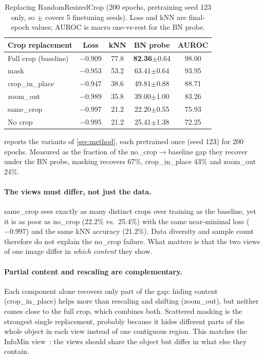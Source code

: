 \documentclass[10pt,twocolumn,letterpaper]{article}
\newcommand{\pmstd}[1]{{\scriptsize$\pm$#1}}
\begin{document}
\begin{table}[t]
\centering
\small
\setlength\tabcolsep{3pt}
\begin{tabular}{lcccc}
\toprule
Crop replacement & Loss & kNN & BN probe & AUROC \\
\midrule
Full crop (baseline) & $-0.909$ & 77.8 & \textbf{82.36}\pmstd{0.64} & 98.00 \\
mask & $-0.953$ & 53.2 & 63.41\pmstd{0.64} & 93.95 \\
crop\_in\_place & $-0.947$ & 38.6 & 49.81\pmstd{0.88} & 88.71 \\
zoom\_out & $-0.989$ & 35.8 & 39.00\pmstd{1.00} & 83.26 \\
same\_crop & $-0.997$ & 21.2 & 22.20\pmstd{0.55} & 75.93 \\
No crop & $-0.995$ & 21.2 & 25.41\pmstd{1.38} & 72.25 \\
\bottomrule
\end{tabular}
\caption{Replacing RandomResizedCrop (200 epochs, pretraining seed 123 only, so $\pm$ covers 5 finetuning seeds). Loss and kNN are final-epoch values; AUROC is macro one-vs-rest for the BN probe.}
\label{tab:crop}
\end{table}

 reports the variants of \cref{sec:method}, each pretrained once (seed 123) for 200 epochs.
Measured as the fraction of the no\_crop$\to$baseline gap they recover under the BN probe, masking recovers 67\%, crop\_in\_place 43\% and zoom\_out 24\%.

\paragraph{The views must differ, not just the data.}
same\_crop sees exactly as many distinct crops over training as the baseline, yet it is as poor as no\_crop (22.2\% vs.\ 25.4\%) with the same near-minimal loss ($-0.997$) and the same kNN accuracy (21.2\%).
Data diversity and sample count therefore do not explain the no\_crop failure. What matters is that the two views of one image differ in \emph{which content} they show.

\paragraph{Partial content and rescaling are complementary.}
Each component alone recovers only part of the gap: hiding content (crop\_in\_place) helps more than rescaling and shifting (zoom\_out), but neither comes close to the full crop, which combines both.
Scattered masking is the strongest single replacement, probably because it hides different parts of the whole object in each view instead of one contiguous region.
This matches the InfoMin view~\cite{tian2020infomin}: the views should share the object but differ in what else they contain.
\end{document}

